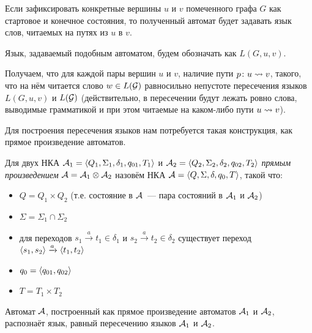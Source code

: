 \begin{proposition}
  Если зафиксировать конкретные вершины $u$ и $v$ помеченного графа $G$ как стартовое и конечное состояния, то полученный автомат будет задавать язык слов, читаемых на путях из $u$ в $v$.

\end{proposition}

Язык, задаваемый подобным автоматом, будем обозначать как $L(G, u, v)$.

Получаем, что для каждой пары вершин $u$ и $v$, наличие пути $p \colon u \rightsquigarrow v$, такого, что на нём читается слово $w \in L(\mathcal{G})$ равносильно непустоте пересечения языков $L(G, u, v)$ и $L(\mathcal{G})$ (действительно, в пересечении будут лежать ровно слова, выводимые грамматикой и при этом читаемые на каком-либо пути $u \rightsquigarrow v$).

Для построения пересечения языков нам потребуется такая конструкция, как прямое произведение автоматов.

\begin{definition}

  Для двух НКА $\mathcal{A}_1 = \langle Q_1, \Sigma_1, \delta_1, q_{01}, T_1 \rangle$ и $\mathcal{A}_2 = \langle Q_2, \Sigma_2, \delta_2, q_{02}, T_2 \rangle$ \textit{прямым произведением} $\mathcal{A} = \mathcal{A}_1 \otimes \mathcal{A}_2$ назовём НКА $\mathcal{A} = \langle Q, \Sigma, \delta, q_0, T \rangle$, такой что:
  \vspace{-\topsep}
  \begin{itemize}
    \setlength\itemsep{-0.1em}
    \item $Q = Q_1 \times Q_2$ (т.е. состояние в $\mathcal{A}$~--- пара состояний в $\mathcal{A}_1$ и $\mathcal{A}_2$)
    \item $\Sigma = \Sigma_1 \cap \Sigma_2$
    \item для переходов $s_1 \xrightarrow{a} t_1 \in \delta_1$ и $s_2 \xrightarrow{a} t_2 \in \delta_2$ существует переход $\langle s_1, s_2 \rangle \xrightarrow{a} \langle t_1, t_2 \rangle$ 
    \item $q_0 = \langle q_{01}, q_{02} \rangle$
    \item $T = T_1 \times T_2$
  \end{itemize}

\end{definition}

\begin{proposition}\label{prop:reg_inter} \cite{Hopcroft1979}
  Автомат $\mathcal{A}$, построенный как прямое произведение автоматов $\mathcal{A}_1$ и $\mathcal{A}_2$, распознаёт язык, равный пересечению языков $\mathcal{A}_1$ и $\mathcal{A}_2$.
\end{proposition}

